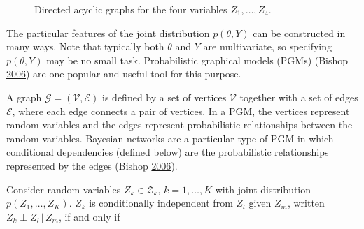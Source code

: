 \documentclass[11pt,]{book}
\begin{document}
\begin{figure}
\centering
{}
\caption{Directed acyclic graphs for the four variables $Z_1, \ldots, Z_4$.}
\label{fig:dag1}
\end{figure}

The particular features of the joint distribution \(p(\theta, Y)\) can
be constructed in many ways. Note that typically both \(\theta\) and
\(Y\) are multivariate, so specifying \(p(\theta, Y)\) may be no small
task. Probabilistic graphical models (PGMs) (Bishop
\protect\hyperlink{ref-bishop2006pattern}{2006}) are one popular and
useful tool for this purpose.

A graph \(\mathcal{G} = (\mathcal{V}, \mathcal{E})\) is defined by a set
of vertices \(\mathcal{V}\) together with a set of edges
\(\mathcal{E}\), where each edge connects a pair of vertices. In a PGM,
the vertices represent random variables and the edges represent
probabilistic relationships between the random variables. Bayesian
networks are a particular type of PGM in which conditional dependencies
(defined below) are the probabilistic relationships represented by the
edges (Bishop \protect\hyperlink{ref-bishop2006pattern}{2006}).

Consider random variables \(Z_k \in \mathcal{Z}_k\),
\(k = 1, \ldots, K\) with joint distribution \(p(Z_1, \ldots, Z_K)\).
\(Z_k\) is conditionally independent from \(Z_l\) given \(Z_m\), written
\(Z_k \perp Z_l \, | \, Z_m\), if and only if
\end{document}
